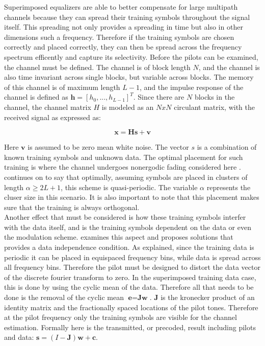 Superimposed equalizers are able to better compensate for large multipath channels because they can spread their training symbols throughout the signal itself.  This spreading not only provides a spreading in time but also in other dimensions such a frequency.  Therefore if the training symbols are chosen correctly and placed correctly, they can then be spread across the frequency spectrum efficently and capture its selectivity.  Before the pilots can be examined, the channel must be defined.  The channel is of block length \(N\), and the channel is also time invariant across single blocks, but variable across blocks.  The memory of this channel is of maximum length \(L-1\), and the impulse response of the channel is defined as \(\textbf{h}=[h_{0},...,h_{L-1}]^{T}\).  Since there are \(N\) blocks in the channel, the channel matrix \(H\) is modeled as an \(N x N\) circulant matrix, with the received signal as expressed as:

\[ \textbf{x}=\textbf{H}\textbf{s}+\textbf{v}  \]

Here \(\textbf{v}\) is assumed to be zero mean white noise.  The vector \(s\) is a combination of known training symbols and unknown data.  The optimal placement for such training is where the channel undergoes nonergodic fading considered here \cite{20}.  \cite{16} continues on to say that optimally, assuming symbols are placed in clusters of length \(\alpha \ge 2L+1\), this scheme is quasi-periodic.  The variable \(\alpha\) represents the cluser size in this scenario.  It is also important to note that this placement makes sure that the training is always orthogonal.\\

Another effect that must be considered is how these training symbols interfer with the data itself, and is the training symbols dependent on the data or even the modulation scheme.  \cite{Ghogho} examines this aspect and proposes solutions that provides a data independence condition.  As explained, since the training data is periodic it can be placed in equispaced frequency bins, while data is spread across all frequency bins.   Therefore the pilot must be designed to distort the data vector of the discrete fourier transform to zero.  In the superimposed training data case, this is done by using the cyclic mean of the data.  Therefore all that needs to be done is the removal of the cyclic mean \(\textbf{e}=\textbf{Jw}\).  \(\textbf{J}\) is the kronecker product of an identity matrix and the fractionally spaced locations of the pilot tones.  Therefore at the pilot frequency only the training symbols are visible for the channel estimation.  Formally here is the transmitted, or precoded, result including pilots and data: \( \textbf{s}= (I-\textbf{J})\textbf{w}+\textbf{c}  \).\\




